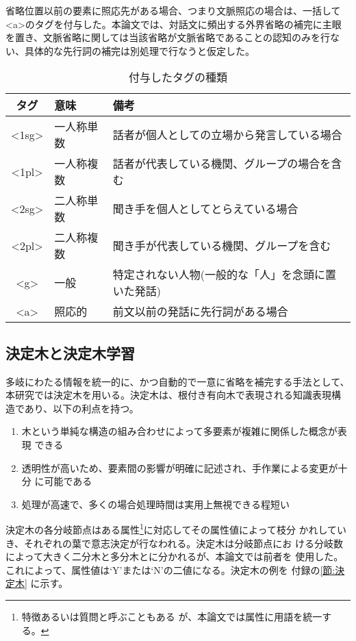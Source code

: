 省略位置以前の要素に照応先がある場合、つまり文脈照応の場合は、一括して
<a>のタグを付与した。本論文では、対話文に頻出する外界省略の補完に主眼
を置き、文脈省略に関しては当該省略が文脈省略であることの認知のみを行な
い、具体的な先行詞の補完は別処理で行なうと仮定した。


\begin{table}
\begin{center}
\caption{付与したタグの種類}
\label{タグ}
\begin{tabular}{cll}
\hline\hline
タグ    &       意味       & 備考\\
\hline
<1sg>   &       一人称単数 & 話者が個人としての立場から発言している場合 \\
<1pl>   &       一人称複数 & 話者が代表している機関、グループの場合を含む\\
<2sg>   &       二人称単数 & 聞き手を個人としてとらえている場合 \\
<2pl>   &       二人称複数 & 聞き手が代表している機関、グループを含む \\
\hline
<g>             &       一般 & 特定されない人物(一般的な「人」を念頭に置いた発話) \\
<a>             &       照応的 & 前文以前の発話に先行詞がある場合 \\
\hline
\end{tabular}
\end{center}
\end{table}




\subsection{決定木と決定木学習}

多岐にわたる情報を統一的に、かつ自動的で一意に省略を補完する手法として、
本研究では決定木を用いる。決定木は、根付き有向木で表現される知識表現構
造であり、以下の利点を持つ。

\begin{enumerate}
\item
木という単純な構造の組み合わせによって多要素が複雑に関係した概念が表現
できる
\item
透明性が高いため、要素間の影響が明確に記述され、手作業による変更が十分
に可能である
\item
処理が高速で、多くの場合処理時間は実用上無視できる程短い
\end{enumerate}

決定木の各分岐節点はある属性\footnote{特徴あるいは質問と呼ぶこともある
が、本論文では属性に用語を統一する。}に対応してその属性値によって枝分
かれしていき、それぞれの葉で意志決定が行なわれる。決定木は分岐節点にお
ける分岐数によって大きく二分木と多分木とに分かれるが、本論文では前者を
使用した。これによって、属性値は`Y'または`N'の二値になる。決定木の例を
付録の\ref{節:決定木} に示す。

